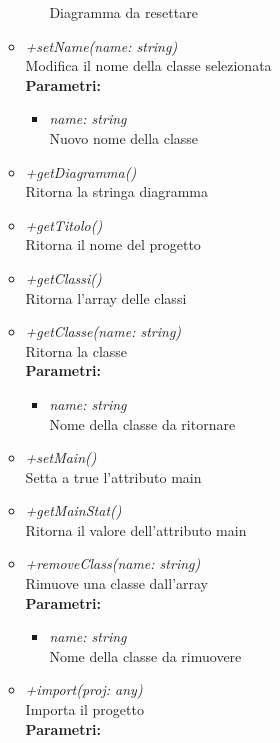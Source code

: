 \begin{itemize}
\begin{itemize}
\begin{itemize}
    			Diagramma da resettare
    		\end{itemize}
    		\item \emph{+setName(name: string)}\\
    		Modifica il nome della classe selezionata\\
    		\textbf{Parametri:}
    		\begin{itemize}
    			\item \emph{name: string}\\
    			Nuovo nome della classe
    		\end{itemize}
    		\item \emph{+getDiagramma()}\\
    		Ritorna la stringa diagramma
    		\item \emph{+getTitolo()}\\
    		Ritorna il nome del progetto
    		\item \emph{+getClassi()}\\
    		Ritorna l'array delle classi
    		\item \emph{+getClasse(name: string)}\\
    		Ritorna la classe\\
    		\textbf{Parametri:}
    		\begin{itemize}
    			\item \emph{name: string}\\
    			Nome della classe da ritornare
    		\end{itemize}
    		\item \emph{+setMain()}\\
    		Setta a true l'attributo main
    		\item \emph{+getMainStat()}\\
    		Ritorna il valore dell'attributo main
    		\item \emph{+removeClass(name: string)}\\
    		Rimuove una classe dall'array\\
    		\textbf{Parametri:}
    		\begin{itemize}
    			\item \emph{name: string}\\
    			Nome della classe da rimuovere
    		\end{itemize}
    		\item \emph{+import(proj: any)}\\
    		Importa il progetto\\
    		\textbf{Parametri:}
    		\begin{itemize}

\end{itemize}
\end{itemize}
\end{itemize}
